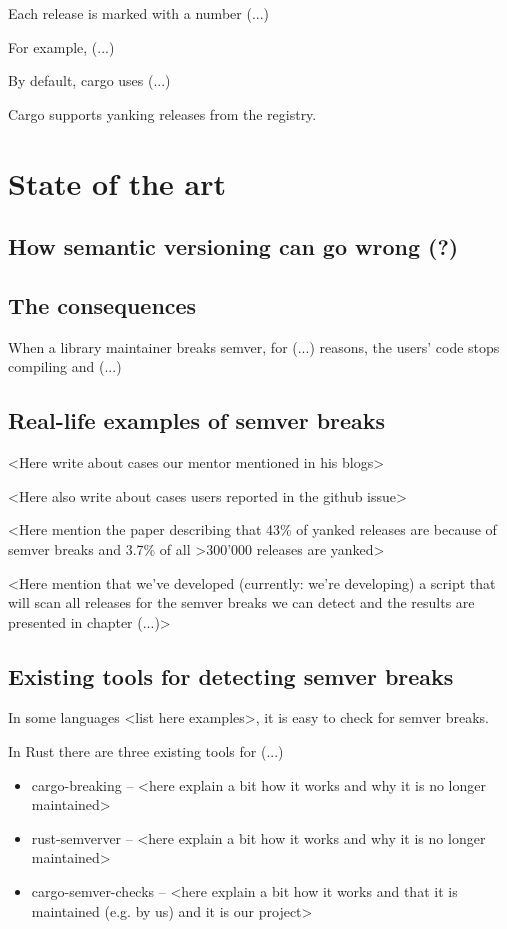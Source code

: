 \documentclass[licencjacka,en]{pracamgr}
\begin{document}
Each release is marked with a number (...)

For example, (...)

By default, cargo uses (...)

Cargo supports yanking releases from the registry.



\chapter{State of the art}\label{r:stateoftheart}

\section{How semantic versioning can go wrong (?)}


\section{The consequences}

When a library maintainer breaks semver, for (...) reasons, the users' code stops compiling and (...)


\section{Real-life examples of semver breaks}

<Here write about cases our mentor mentioned in his blogs>

<Here also write about cases users reported in the github issue>

<Here mention the paper describing that 43\% of yanked releases
are because of semver breaks and 3.7\% of all >300'000 releases are yanked>

<Here mention that we've developed (currently: we're developing)
a script that will scan all releases for the semver breaks
we can detect and the results are presented in chapter (...)>


\section{Existing tools for detecting semver breaks}

In some languages <list here examples>, it is easy to check for semver breaks.

In Rust there are three existing tools for (...)
\begin{itemize}
	\item cargo-breaking -- <here explain a bit how it works and why it is no longer maintained>
	\item rust-semverver -- <here explain a bit how it works and why it is no longer maintained>
	\item cargo-semver-checks -- <here explain a bit how it works and that it is maintained (e.g. by us) and it is our project>
\end{itemize}
\end{document}
